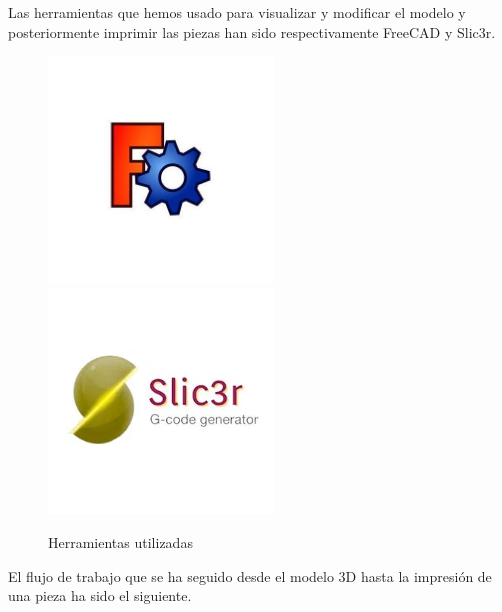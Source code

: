 Las herramientas que hemos usado para visualizar y modificar el modelo y posteriormente imprimir las piezas han sido respectivamente FreeCAD y Slic3r.

\begin{figure}[H]
    \centering
    \includegraphics[width=6cm]{imagenes/freeCAD.jpg}
    \includegraphics[width=6cm]{imagenes/slic3r_logo.jpg}
    \caption{Herramientas utilizadas}
    \label{fig:herramientas_3d}
\end{figure}

El flujo de trabajo que se ha seguido desde el modelo 3D hasta la impresión de una pieza ha sido el siguiente.